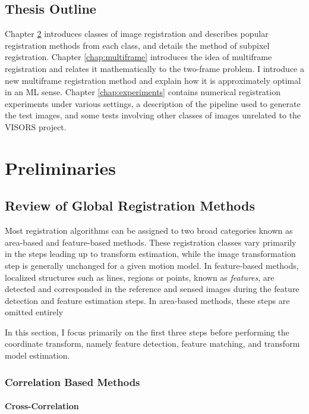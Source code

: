 \documentclass[tocnosub,noragright,centerchapter,12pt]{uiucecethesis09}
\begin{document}
\section{Thesis Outline}

Chapter \ref{chap:preliminaries} introduces classes of image registration and describes popular registration methods from each class, and details the method of subpixel registration.
Chapter \ref{chap:multiframe} introduces the idea of multiframe registration and relates it mathematically to the two-frame problem.  I introduce a new multiframe registration method and explain how it is approximately optimal in an ML sense.
Chapter \ref{chap:experiments} contains numerical registration experiments under various settings, a description of the pipeline used to generate the test images, and some tests involving other classes of images unrelated to the VISORS project.

\chapter{Preliminaries} \label{chap:preliminaries}

\section{Review of Global Registration Methods} \label{sec:methods}

Most registration algorithms can be assigned to two broad categories known as area-based and feature-based methods.  These registration classes vary primarily in the steps leading up to transform estimation, while the image transformation step is generally unchanged for a given motion model.  In feature-based methods, localized structures such as lines, regions or points, known as \emph{features}, are detected and corresponded in the reference and sensed images during the feature detection and feature estimation steps.  In area-based methods, these steps are omitted entirely 

In this section, I focus primarily on the first three steps before performing the coordinate transform, namely feature detection, feature matching, and transform model estimation.

\subsection{Correlation Based Methods}
\subsubsection{Cross-Correlation}
\end{document}
